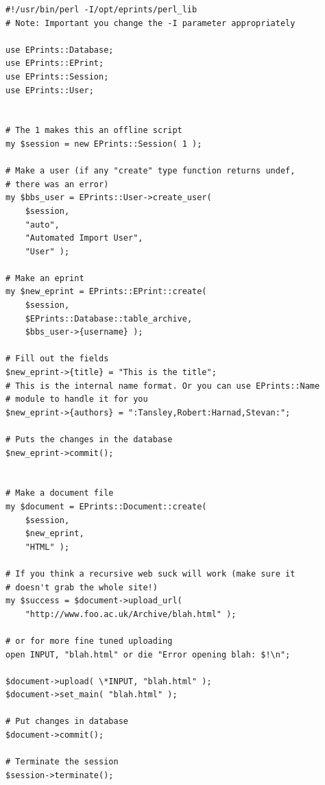 \begin{verbatim}
#!/usr/bin/perl -I/opt/eprints/perl_lib
# Note: Important you change the -I parameter appropriately

use EPrints::Database;
use EPrints::EPrint;
use EPrints::Session;
use EPrints::User;


# The 1 makes this an offline script
my $session = new EPrints::Session( 1 );

# Make a user (if any "create" type function returns undef,
# there was an error)
my $bbs_user = EPrints::User->create_user(
	$session,
	"auto",
	"Automated Import User",
	"User" );

# Make an eprint
my $new_eprint = EPrints::EPrint::create(
	$session,
	$EPrints::Database::table_archive,
	$bbs_user->{username} );

# Fill out the fields
$new_eprint->{title} = "This is the title";
# This is the internal name format. Or you can use EPrints::Name
# module to handle it for you
$new_eprint->{authors} = ":Tansley,Robert:Harnad,Stevan:";

# Puts the changes in the database
$new_eprint->commit();


# Make a document file
my $document = EPrints::Document::create(
	$session,
	$new_eprint,
	"HTML" );

# If you think a recursive web suck will work (make sure it
# doesn't grab the whole site!)
my $success = $document->upload_url(
	"http://www.foo.ac.uk/Archive/blah.html" );

# or for more fine tuned uploading
open INPUT, "blah.html" or die "Error opening blah: $!\n";

$document->upload( \*INPUT, "blah.html" );
$document->set_main( "blah.html" );

# Put changes in database
$document->commit();

# Terminate the session
$session->terminate();
\end{verbatim}

